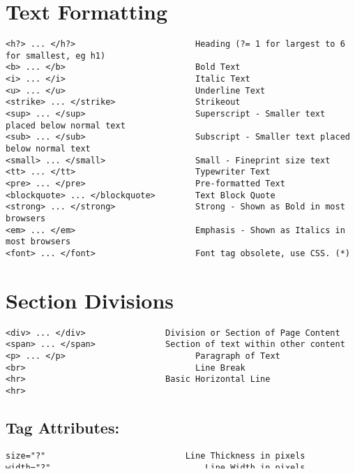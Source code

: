\documentclass[11pt]{article}
\begin{document}
\section*{Text Formatting}
\label{sec:orgcabbc05}
\begin{verbatim}
<h?> ... </h?>                        Heading (?= 1 for largest to 6 for smallest, eg h1)
<b> ... </b>                          Bold Text
<i> ... </i>                          Italic Text
<u> ... </u>                          Underline Text
<strike> ... </strike>                Strikeout
<sup> ... </sup>                      Superscript - Smaller text placed below normal text
<sub> ... </sub>                      Subscript - Smaller text placed below normal text
<small> ... </small>                  Small - Fineprint size text
<tt> ... </tt>                        Typewriter Text
<pre> ... </pre>                      Pre-formatted Text
<blockquote> ... </blockquote>        Text Block Quote
<strong> ... </strong>                Strong - Shown as Bold in most browsers
<em> ... </em>                        Emphasis - Shown as Italics in most browsers
<font> ... </font>                    Font tag obsolete, use CSS. (*)
\end{verbatim}
\section*{Section Divisions}
\label{sec:orgfd415b6}
\begin{verbatim}
<div> ... </div>              	Division or Section of Page Content
<span> ... </span>            	Section of text within other content
<p> ... </p>                          Paragraph of Text
<br>                                  Line Break
<hr>                          	Basic Horizontal Line
<hr>
\end{verbatim}
\subsection*{Tag Attributes:}
\label{sec:org72c6b91}
\begin{verbatim}
size="?"	                        Line Thickness in pixels
width="?"                           	Line Width in pixels
width="??%"                        	Line Width as a percentage
color="#??????"               	Line Colour (*)
align="?"                    	Horizontal Alignment: left, center, right (*)
noshade                      	No 3D cut-out
<nobr> ... </nobr>           	Line Break

\end{verbatim}
\end{document}
